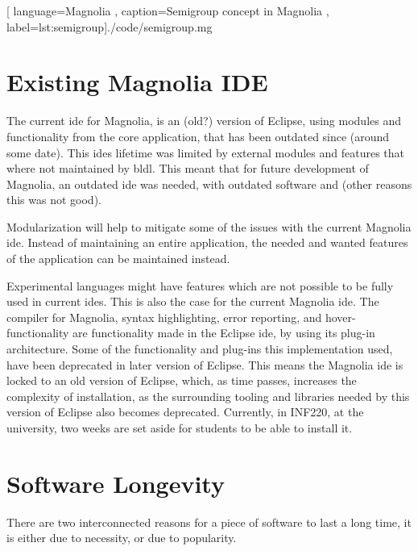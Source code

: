 \begin{center}
  
    [ language=Magnolia
    , caption={Semigroup concept in Magnolia}
    , label=lst:semigroup]{./code/semigroup.mg}
\end{center}

\section{Existing Magnolia IDE}

The current \gls{ide} for Magnolia, is an (old?) version of Eclipse, using modules
and functionality from the core application, that has been outdated since
(around some date). This \gls{ide}s lifetime was limited by external modules and
features that where not maintained by \gls{bldl}. This meant that for future
development of Magnolia, an outdated \gls{ide} was needed, with outdated software
and (other reasons this was not good).

Modularization will help to mitigate some of the issues with the current
Magnolia \gls{ide}. Instead of maintaining an entire application, the needed and
wanted features of the application can be maintained instead.

Experimental languages might have features which are not possible to be fully
used in current \gls{ide}s. This is also the case for the current Magnolia
\gls{ide}. The compiler for Magnolia, syntax highlighting, error reporting, and
hover-functionality are functionality made in the Eclipse \gls{ide}, by using
its plug-in architecture. Some of the functionality and plug-ins this
implementation used, have been deprecated in later version of Eclipse. This
means the Magnolia \gls{ide} is locked to an old version of Eclipse, which, as
time passes, increases the complexity of installation, as the surrounding
tooling and libraries needed by this version of Eclipse also becomes deprecated.
Currently, in INF220, at the university, two weeks are set aside for students to
be able to install it.


\section{Software Longevity}

There are two interconnected reasons for a piece of software to last a long
time, it is either due to necessity, or due to popularity.


